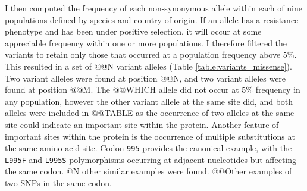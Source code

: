 \documentclass[a4paper,11pt,abstracton,hidelinks]{scrartcl}
\begin{document}
%
I then computed the frequency of each non-synonymous allele within each of nine populations defined by species and country of origin.
%
If an allele has a resistance phenotype and has been under positive selection, it will occur at some appreciable frequency within one or more populations.
%
I therefore filtered the variants to retain only those that occurred at a population frequency above 5\%.
%
This resulted in a set of @@N variant alleles (Table \ref{table:variants_missense}).
%
Two variant alleles were found at position @@N, and two variant alleles were found at position @@M.
%
The @@WHICH allele did not occur at 5\% frequency in any population, however the other variant allele at the same site did, and both alleles were included in @@TABLE as the occurrence of two alleles at the same site could indicate an important site within the protein.
%
Another feature of important sites within the protein is the occurrence of multiple substitutions at the same amino acid site.
%
Codon \texttt{995} provides the canonical example, with the \texttt{L995F} and \texttt{L995S} polymorphisms occurring at adjacent nucleotides but affecting the same codon.
%
@N other similar examples were found.
%
@@Other examples of two SNPs in the same codon.
\end{document}
